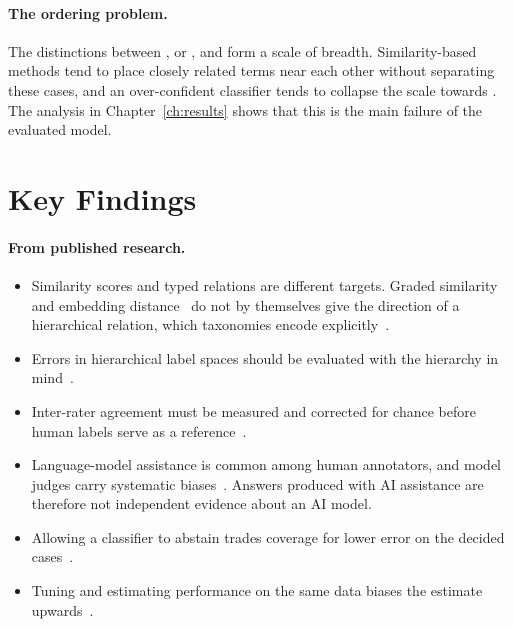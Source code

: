 \paragraph{The ordering problem.} The distinctions between \SC, \CH{} or \PA, \PO{} and \RE{} form a scale of breadth. Similarity-based methods tend to place closely related terms near each other without separating these cases, and an over-confident classifier tends to collapse the scale towards \SC. The analysis in Chapter~\ref{ch:results} shows that this is the main failure of the evaluated model.

\section{Key Findings}
\label{sec:keyfindings}

\paragraph{From published research.}
\begin{itemize}
    \item Similarity scores and typed relations are different targets. Graded similarity and embedding distance~\cite{agirre2012,reimers2019} do not by themselves give the direction of a hierarchical relation, which taxonomies encode explicitly~\cite{miller1995,miles2009skos,euzenat2013}.
    \item Errors in hierarchical label spaces should be evaluated with the hierarchy in mind~\cite{silla2011}.
    \item Inter-rater agreement must be measured and corrected for chance before human labels serve as a reference~\cite{cohen1960,landis1977}.
    \item Language-model assistance is common among human annotators, and model judges carry systematic biases~\cite{veselovsky2023,zheng2023}. Answers produced with AI assistance are therefore not independent evidence about an AI model.
    \item Allowing a classifier to abstain trades coverage for lower error on the decided cases~\cite{chow1970,geifman2017}.
    \item Tuning and estimating performance on the same data biases the estimate upwards~\cite{cawley2010}.
\end{itemize}

